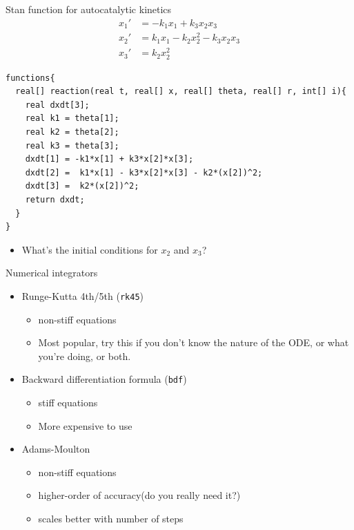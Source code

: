 \documentclass[presentation, allowframebreaks]{beamer}
\begin{document}
\begin{frame}[fragile,label={sec:orgc673f4f}]{Stan function for autocatalytic kinetics}
 \begin{align*}
x_1' &= -k_1x_1 + k_3x_2x_3\\
x_2' &=  k_1x_1 - k_2x_2^2 - k_3x_2x_3\\
x_3' &=  k_2x_2^2
\end{align*}

\begin{verbatim}
functions{
  real[] reaction(real t, real[] x, real[] theta, real[] r, int[] i){
    real dxdt[3];
    real k1 = theta[1];
    real k2 = theta[2];
    real k3 = theta[3];
    dxdt[1] = -k1*x[1] + k3*x[2]*x[3];
    dxdt[2] =  k1*x[1] - k3*x[2]*x[3] - k2*(x[2])^2;
    dxdt[3] =  k2*(x[2])^2;
    return dxdt;
  }
}
\end{verbatim}
\begin{itemize}
\item What's the initial conditions for \(x_2\) and \(x_3\)?
\end{itemize}
\end{frame}

\begin{frame}[fragile,label={sec:orgbedfbcd}]{Numerical integrators}
 \begin{itemize}
\item Runge-Kutta 4th/5th (\texttt{rk45})
\begin{itemize}
\item non-stiff equations
\item Most popular, try this if you don't know the nature of the ODE, or what you're doing, or both.
\end{itemize}
\item Backward differentiation formula (\texttt{bdf})
\begin{itemize}
\item stiff equations
\item More expensive to use
\end{itemize}
\item Adams-Moulton
\begin{itemize}
\item non-stiff equations
\item higher-order of accuracy(do you really need it?)
\item scales better with number of steps
\end{itemize}
\end{itemize}
\end{frame}
\end{document}
